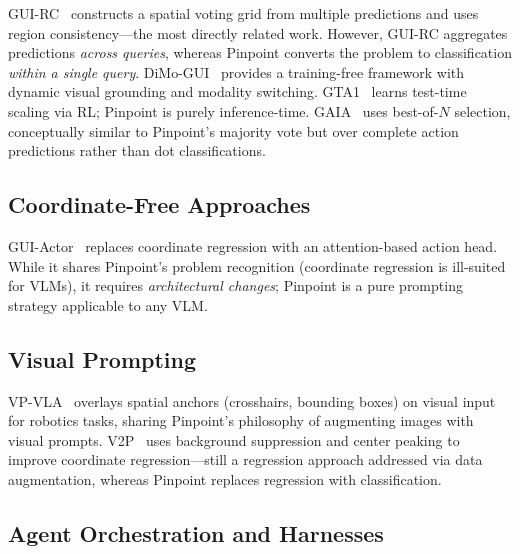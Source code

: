 \documentclass[sigconf,nonacm]{acmart}
\begin{document}
GUI-RC~\cite{guirc} constructs a spatial voting grid from multiple
predictions and uses region consistency---the most directly related
work.  However, GUI-RC aggregates predictions \emph{across queries},
whereas Pinpoint converts the problem to classification \emph{within a
single query}.
DiMo-GUI~\cite{dimogui} provides a training-free framework with
dynamic visual grounding and modality switching.
GTA1~\cite{gta1} learns test-time scaling via RL; Pinpoint is purely
inference-time.
GAIA~\cite{gaia} uses best-of-$N$ selection, conceptually similar to
Pinpoint's majority vote but over complete action predictions rather
than dot classifications.

\subsection{Coordinate-Free Approaches}

GUI-Actor~\cite{guiactor} replaces coordinate regression with an
attention-based action head.  While it shares Pinpoint's problem
recognition (coordinate regression is ill-suited for VLMs), it
requires \emph{architectural changes}; Pinpoint is a pure prompting
strategy applicable to any VLM.

\subsection{Visual Prompting}

VP-VLA~\cite{vpvla} overlays spatial anchors (crosshairs, bounding
boxes) on visual input for robotics tasks, sharing Pinpoint's
philosophy of augmenting images with visual prompts.
V2P~\cite{v2p} uses background suppression and center peaking to
improve coordinate regression---still a regression approach addressed
via data augmentation, whereas Pinpoint replaces regression with
classification.

\subsection{Agent Orchestration and Harnesses}
\end{document}
